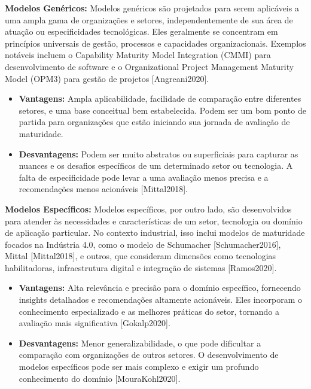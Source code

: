 \textbf{Modelos Genéricos:}
Modelos genéricos são projetados para serem aplicáveis a uma ampla gama de organizações e setores, independentemente de sua área de atuação ou especificidades tecnológicas. Eles geralmente se concentram em princípios universais de gestão, processos e capacidades organizacionais. Exemplos notáveis incluem o Capability Maturity Model Integration (CMMI) para desenvolvimento de software e o Organizational Project Management Maturity Model (OPM3) para gestão de projetos [Angreani2020].

\begin{itemize}
    \item \textbf{Vantagens:} Ampla aplicabilidade, facilidade de comparação entre diferentes setores, e uma base conceitual bem estabelecida. Podem ser um bom ponto de partida para organizações que estão iniciando sua jornada de avaliação de maturidade.
    \item \textbf{Desvantagens:} Podem ser muito abstratos ou superficiais para capturar as nuances e os desafios específicos de um determinado setor ou tecnologia. A falta de especificidade pode levar a uma avaliação menos precisa e a recomendações menos acionáveis [Mittal2018].
\end{itemize}

\textbf{Modelos Específicos:}
Modelos específicos, por outro lado, são desenvolvidos para atender às necessidades e características de um setor, tecnologia ou domínio de aplicação particular. No contexto industrial, isso inclui modelos de maturidade focados na Indústria 4.0, como o modelo de Schumacher [Schumacher2016], Mittal [Mittal2018], e outros, que consideram dimensões como tecnologias habilitadoras, infraestrutura digital e integração de sistemas [Ramos2020].

\begin{itemize}
    \item \textbf{Vantagens:} Alta relevância e precisão para o domínio específico, fornecendo insights detalhados e recomendações altamente acionáveis. Eles incorporam o conhecimento especializado e as melhores práticas do setor, tornando a avaliação mais significativa [Gokalp2020].
    \item \textbf{Desvantagens:} Menor generalizabilidade, o que pode dificultar a comparação com organizações de outros setores. O desenvolvimento de modelos específicos pode ser mais complexo e exigir um profundo conhecimento do domínio [MouraKohl2020].
\end{itemize}

